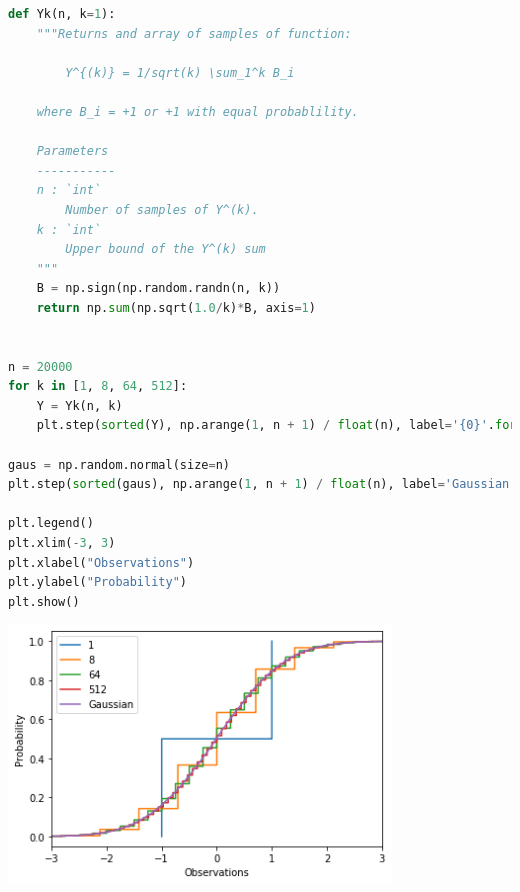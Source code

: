 \documentclass{article}
\newcommand{\1}{\mathbf{1}}
\begin{document}
\begin{enumerate}
\begin{lstlisting}[language=Python]
def Yk(n, k=1):
    """Returns and array of samples of function:
    
        Y^{(k)} = 1/sqrt(k) \sum_1^k B_i
    
    where B_i = +1 or +1 with equal probablility. 
    
    Parameters
    -----------
    n : `int`
        Number of samples of Y^(k). 
    k : `int`
        Upper bound of the Y^(k) sum
    """
    B = np.sign(np.random.randn(n, k))
    return np.sum(np.sqrt(1.0/k)*B, axis=1)


n = 20000
for k in [1, 8, 64, 512]:
    Y = Yk(n, k)
    plt.step(sorted(Y), np.arange(1, n + 1) / float(n), label='{0}'.format(k))

gaus = np.random.normal(size=n)
plt.step(sorted(gaus), np.arange(1, n + 1) / float(n), label='Gaussian')    

plt.legend()
plt.xlim(-3, 3)
plt.xlabel("Observations")
plt.ylabel("Probability")
plt.show()
    \end{lstlisting}
    \begin{center}
    \includegraphics[width=4in]{HW0_plots/cumdist2.png}
    \end{center} 

\end{enumerate}
\end{document}
